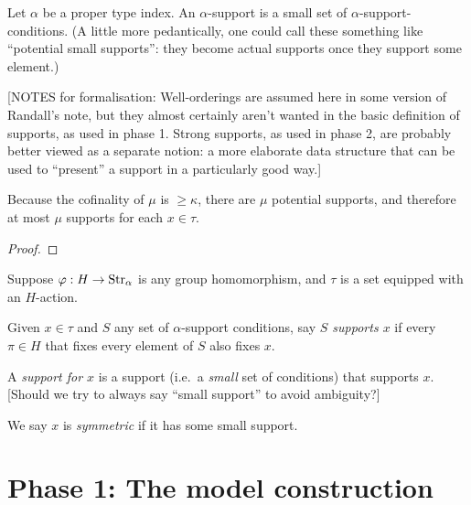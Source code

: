 \begin{definition}
\label{def:support}
\leanok
Let $\alpha$ be a proper type index. An $\alpha$-support is a small set of $\alpha$-support-conditions.  (A little more pedantically, one could call these something like “potential small supports”: they become actual supports once they support some element.)

[NOTES for formalisation: Well-orderings are assumed here in some version of Randall’s note, but they almost certainly aren’t wanted in the basic definition of supports, as used in phase 1. Strong supports, as used in phase 2, are probably better viewed as a separate notion: a more elaborate data structure that can be used to “present” a support in a particularly good way.]
\end{definition}

\begin{lemma}
\label{lem:count-supports}
\leanok
Because the cofinality of $\mu$ is $\geq \kappa$, there are $\mu$ potential supports, and therefore at most $\mu$ supports for each $x \in \tau$.
\end{lemma}
\begin{proof}
\leanok
\end{proof}

\begin{definition}
\label{def:support-of}
  \leanok
  Suppose $\varphi : H \to \mathrm{Str}_\alpha$ is any group homomorphism, and $\tau$ is a set equipped with an $H$-action.

  Given $x \in \tau$ and $S$ any set of $\alpha$-support conditions, say \emph{$S$ supports $x$} if every $\pi \in H$ that fixes every element of $S$ also fixes $x$.

  A \emph{support for $x$} is a support (i.e.\ a \emph{small} set of conditions) that supports $x$. [Should we try to always say “small support” to avoid ambiguity?]

  We say $x$ is \emph{symmetric} if it has some small support.
\end{definition}

\chapter{Phase 1: The model construction} \label{ch:model-construction}

